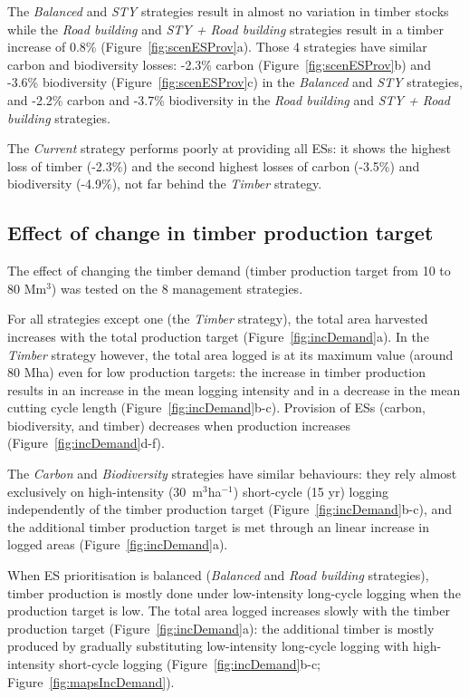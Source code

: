 \documentclass{article}
\begin{document}
The \textit{Balanced} and \textit{STY} strategies result in almost no variation in timber stocks while the \textit{Road building} and \textit{STY + Road building} strategies result in a timber increase of 0.8\% (Figure~\ref{fig:scenESProv}a). Those 4 strategies have similar carbon and biodiversity losses: -2.3\% carbon (Figure~\ref{fig:scenESProv}b) and -3.6\% biodiversity (Figure~\ref{fig:scenESProv}c) in the \textit{Balanced} and \textit{STY} strategies, and -2.2\% carbon and -3.7\% biodiversity in the \textit{Road building} and \textit{STY + Road building} strategies. 

The \textit{Current} strategy performs poorly at providing all ESs: it shows the highest loss of timber (-2.3\%) and the second highest losses of carbon (-3.5\%) and biodiversity (-4.9\%), not far behind the \textit{Timber} strategy. 

\subsection{Effect of change in timber production target}

The effect of changing the timber demand (timber production target from 10 to 80 Mm$^3$) was tested on the 8 management strategies.

For all strategies except one (the \textit{Timber} strategy), the total area harvested increases with the total production target (Figure~\ref{fig:incDemand}a). 
In the \textit{Timber} strategy however, the total area logged is at its maximum value (around 80 Mha) even for low production targets: the increase in timber production results in an increase in the mean logging intensity and in a decrease in the mean cutting cycle length (Figure~\ref{fig:incDemand}b-c). 
Provision of ESs (carbon, biodiversity, and timber) decreases when production increases (Figure~\ref{fig:incDemand}d-f).

The \textit{Carbon} and \textit{Biodiversity} strategies have similar behaviours: they rely almost exclusively on high-intensity (30~m$^3$ha$^{-1}$) short-cycle (15 yr) logging independently of the timber production target (Figure~\ref{fig:incDemand}b-c), and the  additional timber production target is met through an linear increase in logged areas (Figure~\ref{fig:incDemand}a). 

When ES prioritisation is balanced (\textit{Balanced} and \textit{Road building} strategies), timber production is mostly done under low-intensity long-cycle logging when the production target is low. The total area logged increases slowly with the timber production target (Figure~\ref{fig:incDemand}a): the additional timber is mostly produced by gradually substituting low-intensity long-cycle logging with high-intensity short-cycle logging (Figure~\ref{fig:incDemand}b-c; Figure~\ref{fig:mapsIncDemand}). 
\end{document}
